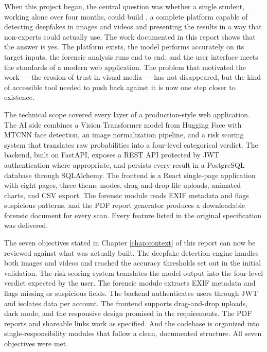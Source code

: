 
When this project began, the central question was whether a single student, working alone over four months, could build \deepguard{}, a complete platform capable of detecting deepfakes in images and videos and presenting the results in a way that non-experts could actually use. The work documented in this report shows that the answer is yes. The platform exists, the model performs accurately on its target inputs, the forensic analysis runs end to end, and the user interface meets the standards of a modern web application. The problem that motivated the work --- the erosion of trust in visual media --- has not disappeared, but the kind of accessible tool needed to push back against it is now one step closer to existence.

The technical scope covered every layer of a production-style web application. The AI side combines a Vision Transformer model from Hugging Face with MTCNN face detection, an image normalization pipeline, and a risk scoring system that translates raw probabilities into a four-level categorical verdict. The backend, built on FastAPI, exposes a REST API protected by JWT authentication where appropriate, and persists every result in a PostgreSQL database through SQLAlchemy. The frontend is a React single-page application with eight pages, three theme modes, drag-and-drop file uploads, animated charts, and CSV export. The forensic module reads EXIF metadata and flags suspicious patterns, and the PDF report generator produces a downloadable forensic document for every scan. Every feature listed in the original specification was delivered.

The seven objectives stated in Chapter \ref{chap:context} of this report can now be reviewed against what was actually built. The deepfake detection engine handles both images and videos and reached the accuracy thresholds set out in the initial validation. The risk scoring system translates the model output into the four-level verdict expected by the user. The forensic module extracts EXIF metadata and flags missing or suspicious fields. The backend authenticates users through JWT and isolates data per account. The frontend supports drag-and-drop uploads, dark mode, and the responsive design promised in the requirements. The PDF reports and shareable links work as specified. And the codebase is organized into single-responsibility modules that follow a clean, documented structure. All seven objectives were met.

